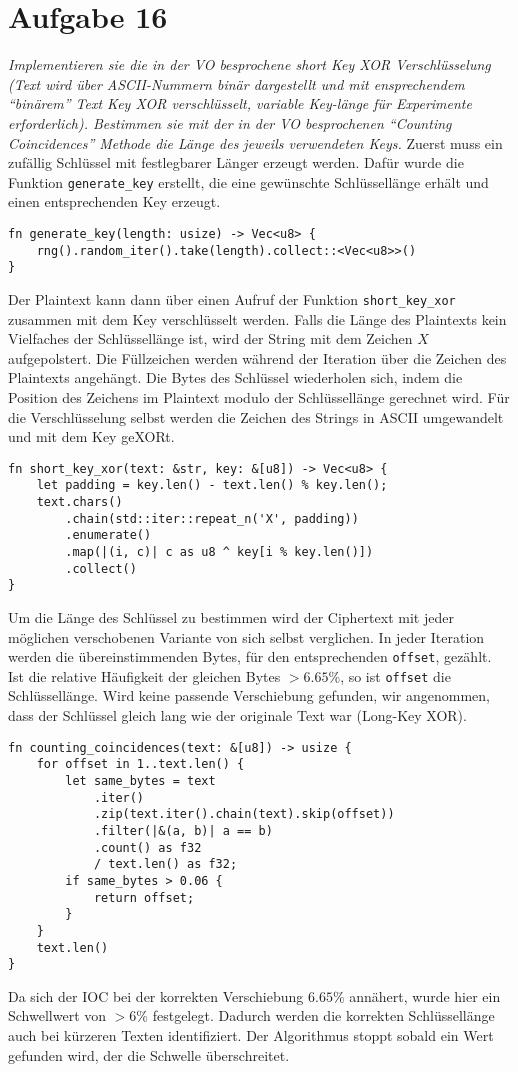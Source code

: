 \section{Aufgabe 16}
\textit{Implementieren sie die in der VO besprochene short Key XOR Verschlüsselung (Text
wird über ASCII-Nummern binär dargestellt und mit ensprechendem “binärem” Text
Key XOR verschlüsselt, variable Key-länge für Experimente erforderlich). Bestimmen 
sie mit der in der VO besprochenen “Counting Coincidences” Methode die 
Länge des jeweils verwendeten Keys.}\vspace*{1em}\newline
Zuerst muss ein zufällig Schlüssel mit festlegbarer Länger erzeugt werden. Dafür wurde die
Funktion \verb|generate_key| erstellt, die eine gewünschte Schlüssellänge erhält und einen entsprechenden 
Key erzeugt.
\begin{verbatim}
fn generate_key(length: usize) -> Vec<u8> {
    rng().random_iter().take(length).collect::<Vec<u8>>()
}
\end{verbatim}
Der Plaintext kann dann über einen Aufruf der Funktion \verb|short_key_xor| zusammen mit dem Key
verschlüsselt werden. Falls die Länge des Plaintexts kein Vielfaches der Schlüssellänge ist, wird der String
mit dem Zeichen $X$ aufgepolstert. Die Füllzeichen werden während der Iteration über die Zeichen des Plaintexts
angehängt. Die Bytes des Schlüssel wiederholen sich, indem die Position des Zeichens im Plaintext modulo der Schlüssellänge
gerechnet wird. Für die Verschlüsselung selbst werden die Zeichen des Strings in ASCII umgewandelt und mit dem Key geXORt.
\begin{verbatim}
fn short_key_xor(text: &str, key: &[u8]) -> Vec<u8> {
    let padding = key.len() - text.len() % key.len();
    text.chars()
        .chain(std::iter::repeat_n('X', padding))
        .enumerate()
        .map(|(i, c)| c as u8 ^ key[i % key.len()])
        .collect()
}
\end{verbatim}
Um die Länge des Schlüssel zu bestimmen wird der Ciphertext mit jeder möglichen verschobenen Variante von sich selbst
verglichen. In jeder Iteration werden die übereinstimmenden Bytes, für den entsprechenden \verb|offset|, gezählt. 
Ist die relative Häufigkeit der gleichen Bytes $>6.65\%$, so ist \verb|offset| die Schlüssellänge. Wird keine
passende Verschiebung gefunden, wir angenommen, dass der Schlüssel gleich lang wie der originale Text war (Long-Key XOR).
\begin{verbatim}
fn counting_coincidences(text: &[u8]) -> usize {
    for offset in 1..text.len() {
        let same_bytes = text
            .iter()
            .zip(text.iter().chain(text).skip(offset))
            .filter(|&(a, b)| a == b)
            .count() as f32
            / text.len() as f32;
        if same_bytes > 0.06 {
            return offset;
        }
    }
    text.len()
}
\end{verbatim}
Da sich der IOC bei der korrekten Verschiebung $6.65\%$ annähert, wurde hier ein Schwellwert von $>6\%$ festgelegt. Dadurch
werden die korrekten Schlüssellänge auch bei kürzeren Texten identifiziert. Der Algorithmus stoppt sobald ein Wert gefunden wird,
der die Schwelle überschreitet.
